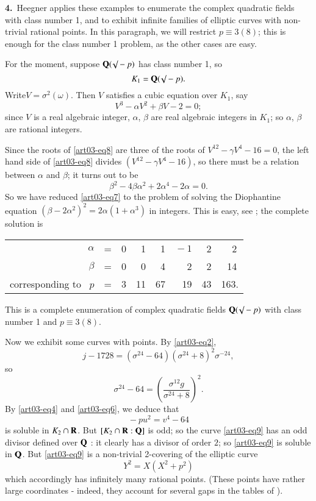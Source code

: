 \medskip
\noindent
{\bf 4.}~Heegner applies these examples to enumerate the complex quadratic fields with class number 1, and to exhibit infinite families of elliptic curves with non-trivial rational points. In this paragraph, we will restrict $p\equiv 3(8)$; this is enough for the class number 1 problem, as the other cases are easy.

For the moment, suppose $\mathbf{Q}(\surd -p)$ has class number 1, so
\begin{equation}
K_{1}=\mathbf{Q}(\surd - p).\label{art03-eq7}
\end{equation}
Write\pageoriginale $V=\sigma^{2}(\omega)$. Then $V$ satisfies a cubic equation over $K_{1}$, say
\begin{equation}
V^{3}-\alpha V^{2}+\beta V-2=0;\label{art03-eq8}
\end{equation}
since $V$ is a real algebraic integer, $\alpha$, $\beta$ are real algebraic integers in $K_{1}$; so $\alpha$, $\beta$ are rational integers.

Since the roots of \eqref{art03-eq8} are three of the roots of $V^{12}-\gamma V^{4}-16=0$, the left hand side of \eqref{art03-eq8} divides $(V^{12}-\gamma V^{4}-16)$, so there must be a relation between $\alpha$ and $\beta$; it turns out to be
$$
\beta^{2}-4\beta\alpha^{2}+2\alpha^{4}-2\alpha=0.
$$
So we have reduced \eqref{art03-eq7} to the problem of solving the Diophantine equation $(\beta-2\alpha^{2})^{2}=2\alpha(1+\alpha^{3})$ in integers. This is easy, see \cite{art03-key5}; the complete solution is
\begin{center}
\begin{tabular}{rrrrrrrr}
$\alpha$ & = & 0 & 1 & 1 & ${}-1$ & 2 & 2\,\\[3pt]
$\beta$ & = & 0 & 0 & 4 & 2 & 2 & 14\,\\[3pt]
corresponding to~ $p$ & = & 3 & 11 & 67 & 19 & 43 & 163.
\end{tabular}
\end{center}
This is a complete enumeration of complex quadratic fields $\mathbf{Q}(\surd-p)$ with class number 1 and $p\equiv 3(8)$.

Now we exhibit some curves with points. By \eqref{art03-eq2},
$$
j-1728=(\sigma^{24}-64)(\sigma^{24}+8)^{2}\sigma^{-24},
$$
so
$$
\sigma^{24}-64=\left(\dfrac{\sigma^{12}g}{\sigma^{24}+8}\right)^{2}.
$$
By \eqref{art03-eq4} and \eqref{art03-eq6}, we deduce that
\begin{equation}
{}-pu^{2}=v^{4}-64\label{art03-eq9}
\end{equation}
is soluble in $K_{2}\cap \mathbf{R}$. But $[K_{2}\cap \mathbf{R}:\mathbf{Q}]$ is odd; so the curve \eqref{art03-eq9} has an odd divisor defined over $\mathbf{Q}$ : it clearly has a divisor of order $2$; so \eqref{art03-eq9} is soluble in $\mathbf{Q}$. But \eqref{art03-eq9} is a non-trivial 2-covering of the elliptic curve
\begin{equation}
Y^{2}=X(X^{2}+p^{2})\label{art03-eq10}
\end{equation}
which accordingly has infinitely many rational points. (These points have rather large coordinates - indeed, they account for several gaps in the tables of \cite{art03-key2}).

